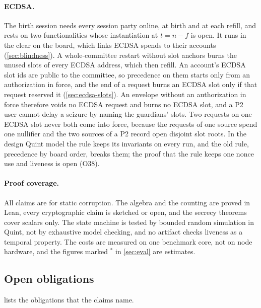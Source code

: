 \paragraph{ECDSA.} The birth session needs every session party online, at birth and at each refill, and rests on two functionalities whose instantiation at $t = n - f$ is open. It runs in the clear on the board, which links ECDSA spends to their accounts (\cref{sec:blindness}). A whole-committee restart without slot anchors burns the unused slots of every ECDSA address, which then refill. An account's ECDSA slot ids are public to the committee, so precedence on them starts only from an authorization in force, and the end of a request burns an ECDSA slot only if that request reserved it (\cref{sec:ecdsa-slots}). An envelope without an authorization in force therefore voids no ECDSA request and burns no ECDSA slot, and a P2 user cannot delay a seizure by naming the guardians' slots. Two requests on one ECDSA slot never both come into force, because the requests of one source spend one nullifier and the two sources of a P2 record open disjoint slot roots. In the design Quint model the rule keeps its invariants on every run, and the old rule, precedence by board order, breaks them; the proof that the rule keeps one nonce use and liveness is open (O38).

\paragraph{Proof coverage.} All claims are for static corruption. The algebra and the counting are proved in Lean, every cryptographic claim is sketched or open, and the secrecy theorems cover scalars only. The state machine is tested by bounded random simulation in Quint, not by exhaustive model checking, and no artifact checks liveness as a temporal property. The costs are measured on one benchmark core, not on node hardware, and the figures marked $^{\ast}$ in \cref{sec:eval} are estimates.

\subsection{Open obligations}\label{sec:open}

 lists the obligations that the claims name.

